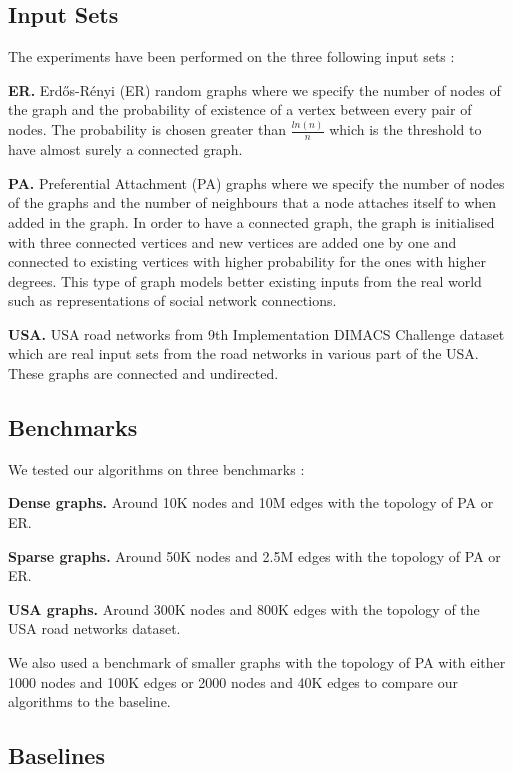 \documentclass[letterpaper]{article}
\newcommand{\mypar}[1]{{\bf #1.}}
\begin{document}
\subsection{Input Sets}
The experiments have been performed on the three following input sets :

\mypar{ER} Erd\H{o}s-R\'{e}nyi (ER) random graphs where we specify the number of nodes of the graph and the probability of existence of a vertex between every pair of nodes. The probability is chosen greater than $\frac{ln(n)}{n}$ which is the threshold to have almost surely a connected graph.

\mypar{PA} Preferential Attachment (PA) graphs where we specify the number of nodes of the graphs and the number of neighbours that a node attaches itself to when added in the graph. In order to have a connected graph, the graph is initialised with three connected vertices and new vertices are added one by one and connected to existing vertices with higher probability for the ones with higher degrees. This type of graph models better existing inputs from the real world such as representations of social network connections.  

\mypar{USA} USA road networks from 9th Implementation DIMACS Challenge dataset which are real input sets from the road networks in various part of the USA. These graphs are connected and undirected.

\subsection{Benchmarks}

We tested our algorithms on three benchmarks :

\mypar{Dense graphs} Around 10K nodes and 10M edges with the topology of PA or ER.

\mypar{Sparse graphs} Around 50K nodes and 2.5M edges with the topology of PA or ER.

\mypar{USA graphs} Around 300K nodes and 800K edges with the topology of the USA road networks dataset.


We also used a benchmark of smaller graphs with the topology of PA with either 1000 nodes and 100K edges or 2000 nodes and 40K edges to compare our algorithms to the baseline.

\subsection{Baselines} \label{sec:baseline}
\end{document}
